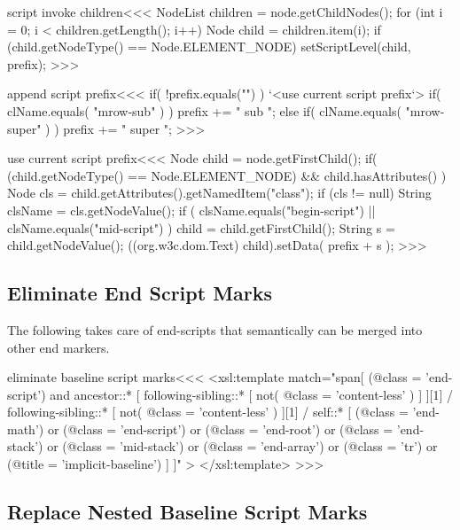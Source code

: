 \documentclass{article}
\begin{document}
\<script invoke children\><<<
NodeList children = node.getChildNodes();
for (int i = 0; i < children.getLength(); i++) {
   Node child = children.item(i);
   if (child.getNodeType() == Node.ELEMENT_NODE) {
      setScriptLevel(child, prefix);
}  }
>>>

\<append script prefix\><<<
if( !prefix.equals("") ){
  `<use current script prefix`>
}
if( clName.equals( "mrow-sub" ) ){ prefix += " sub "; }
else
if( clName.equals( "mrow-super" ) ){ prefix += " super "; }
>>>


\<use current script prefix\><<<
Node child = node.getFirstChild();
if( (child.getNodeType() == Node.ELEMENT_NODE) 
    &&
    child.hasAttributes()
){
   Node cls = child.getAttributes().getNamedItem("class");
   if (cls != null) {
      String clsName = cls.getNodeValue();
      if ( clsName.equals("begin-script")
           ||
           clsName.equals("mid-script")
      ) {
         child = child.getFirstChild();
         String s = child.getNodeValue();
         ((org.w3c.dom.Text) child).setData( prefix + s );
}  }  }
>>>
 


\subsection{Eliminate  End Script Marks}


The following takes care of end-scripts that semantically can be
merged into other end markers.

\<eliminate baseline script marks\><<<
<xsl:template match="span[
   (@class = 'end-script')
   and
   ancestor::* [ following-sibling::* [
                         not( @class = 'content-less' )
                      ] 
               ][1]
           / following-sibling::* [
                         not( @class = 'content-less' )
                     ][1] 
           / self::*
    [
       (@class = 'end-math') 
       or
       (@class = 'end-script') 
       or
       (@class = 'end-root') 
       or
       (@class = 'end-stack') 
       or
       (@class = 'mid-stack') 
       or
       (@class = 'end-array') 
       or
       (@class = 'tr') 
       or
       (@title = 'implicit-baseline') 
    ]
]"  >
</xsl:template> 
>>>



\subsection{Replace Nested Baseline Script Marks}
\end{document}
